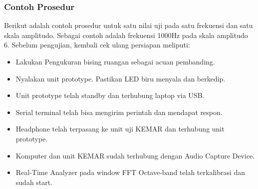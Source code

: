 \documentclass[12pt,]{article}
\begin{document}
	\newpage
	\subsubsection{Contoh Prosedur}
	
	Berikut adalah contoh prosedur untuk satu nilai uji pada satu frekuensi dan satu skala amplitudo.
	Sebagai contoh adalah frekuensi 1000Hz pada skala amplitudo 6.
	Sebelum pengujian, kembali cek ulang persiapan meliputi:
	\begin{itemize}
		\item Lakukan Pengukuran bising ruangan sebagai acuan pembanding.
		\item Nyalakan unit prototype. Pastikan LED biru menyala dan berkedip.
		\item Unit prototype telah standby dan terhubung laptop via USB.
		\item Serial terminal telah bisa mengirim perintah dan mendapat respon.
		\item Headphone telah terpasang ke unit uji KEMAR dan terhubung unit prototype.
		\item Komputer dan unit KEMAR sudah terhubung dengan Audio Capture Device.
		\item Real-Time Analyzer pada window FFT Octave-band telah terkalibrasi dan sudah start.
	\end{itemize}
	
\end{document}
